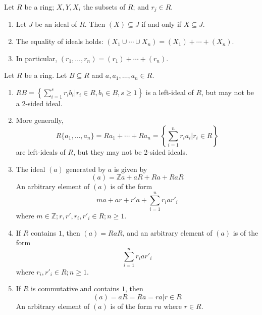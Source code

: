 \begin{proposition}
Let $R$ be a ring; $X, Y, X_i$ the subsets of $R$; and $r_j \in R$.
\begin{enumerate}[label=(\roman*)]
\item Let $J$ be an ideal of $R$. Then $(X) \subseteq J$ if and only if $X \subseteq J$.
\item The equality of ideals holds: $(X_1 \cup \cdots \cup X_n) = (X_1) + \cdots + (X_n)$.
\item In particular, $(r_1, \ldots, r_n) = (r_1) + \cdots + (r_n)$.
\end{enumerate}
\end{proposition}


\begin{proposition}
Let $R$ be a ring. Let $B\subseteq R$ and $a, a_1, \ldots, a_n \in R$.
\begin{enumerate}[label=(\roman*)]
\item $RB = \left\{\sum_{i=1}^{s} r_i b_i | r_i \in R, b_i \in B, s \geq 1 \right\}$ is a left-ideal of $R$, but may not be a 2-sided ideal.
\item More generally,
\begin{equation}
R\{a_1, \ldots, a_n\} = Ra_1 + \cdots + Ra_n = \left\{\sum_{i=1}^{n} r_i a_i | r_i \in R \right\} \nonumber	
\end{equation} 
are left-ideals of $R$, but they may not be 2-sided ideals.
\item The ideal $(a)$ generated by $a$ is given by
\begin{equation}
(a)=\mathbb{Z}a + aR + Ra + RaR \nonumber
\end{equation}
An arbitrary element of $(a)$ is of the form
\begin{equation}
ma + ar + r'a + \sum_{i=1}^{n} r_i a r'_i \nonumber
\end{equation}
where $m\in \mathbb{Z}; r, r', r_i, r'_i \in R; n \geq 1$.
\item If $R$ contains $1$, then $(a)=RaR$, and an arbitrary element of $(a)$ is of the form 
\begin{equation}
\sum_{i=1}^{n} r_i a r'_i \nonumber
\end{equation} 
where $r_i, r'_i \in R; n \geq 1$.
\item If $R$ is commutative and contains $1$, then
\begin{equation}
(a)=aR=Ra={ra|r\in R} \nonumber
\end{equation} 
An arbitrary element of $(a)$ is of the form $ra$ where $r \in R$.
\end{enumerate}
\end{proposition}


